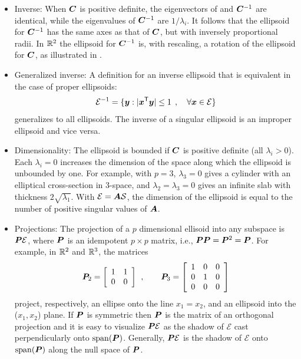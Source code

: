 \begin{itemize}
 \item Inverse: When $\bm{C}$ is positive definite, the eigenvectors of  and $\bm{C}^{-1}$ are identical, while 
the
 eigenvalues of $\bm{C}^{-1}$ are $1/\lambda_i$. It follows that the ellipsoid for
 $\bm{C}^{-1}$ has the same axes as that of $\bm{C}$, but with inversely proportional radii.
 In $\mathbb{R}^{2}$ the ellipsoid for $\bm{C}^{-1}$
 is, with rescaling, a  rotation of the ellipsoid for $\bm{C}$,
 as illustrated in .

 \item Generalized inverse: A definition for an inverse ellipsoid that is equivalent in the case of proper ellipsoids:
\begin{equation}\label{eq:ellipseginv}
\mathcal{E}^{-1} = \{ \bm{y} :   |\bm{x} ^\mathsf{T} \bm{y}| \le 1 \:\: , \quad \forall \bm{x} \in \mathcal{E} \}
\end{equation}
generalizes to all ellipsoids. The inverse of a singular ellipsoid is an improper ellipsoid and vice versa.

 \item Dimensionality: The ellipsoid is bounded if $\bm{C}$ is positive definite (all $\lambda_i > 0$).
 Each $\lambda_i = 0$ increases the dimension of the space along which the ellipsoid is unbounded by one.  
For example, with $p=3$, $\lambda_3=0$ gives a
cylinder with an elliptical cross-section in 3-space, and  $\lambda_2 = \lambda_3=0$ gives an infinite slab with thickness $2 \sqrt{\lambda_1}$. With $\mathcal{E} = \bm{A} \mathcal{S}$, the dimension of the ellipsoid is equal to the number of positive singular values of $\bm{A}$.  
 \item Projections: The projection of a $p$ dimensional ellisoid into any subspace
is $\bm{P} \mathcal{E}$, where
$\bm{P}$ is an idempotent $p \times p$ matrix, i.e., $\bm{P} \bm{P}= \bm{P}^2 = \bm{P}$.
For example, in $\mathbb{R}^{2}$ and $\mathbb{R}^{3}$,
the matrices
\[
\bm{P}_2 =
\left[
\begin{array}{cc}
 1 & 1  \\
 0 & 0  \\
\end{array}
\right]
\:\: , \quad\quad 
\bm{P}_3 =
\left[
\begin{array}{ccc}
 1 & 0 & 0 \\
 0 & 1 & 0 \\
 0 & 0 & 0 \\
\end{array}
\right]
\]
project, respectively, an ellipse onto the line $x_1 = x_2$, and an ellipsoid into the ($x_1, x_2$) plane.  If $\bm{P}$ is symmetric then $\bm{P}$ is the matrix of an orthogonal projection and it is easy to visualize  $\bm{P} \mathcal{E}$ as the shadow of  $\mathcal{E}$ cast perpendicularly onto  $\mathrm{span}(\bm{P})$. Generally,  $\bm{P} \mathcal{E}$ is the shadow of $\mathcal{E}$  onto  $\mathrm{span}(\bm{P})$ along the null space of $\bm{P}$. 


\end{itemize}
